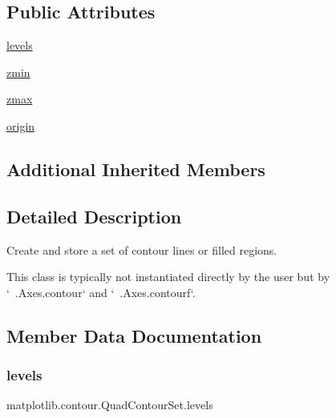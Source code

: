\subsection*{Public Attributes}
\begin{DoxyCompactItemize}
\item 
\hyperlink{classmatplotlib_1_1contour_1_1QuadContourSet_a58fe78201e575f21f0baed0d43b0fac7}{levels}
\item 
\hyperlink{classmatplotlib_1_1contour_1_1QuadContourSet_ad5110dcd6f08c55dcf68a42a78476958}{zmin}
\item 
\hyperlink{classmatplotlib_1_1contour_1_1QuadContourSet_af66067745a8238e5e80e506277aa6633}{zmax}
\item 
\hyperlink{classmatplotlib_1_1contour_1_1QuadContourSet_a8320c500f86a73176c028c9a96a0c6e5}{origin}
\end{DoxyCompactItemize}
\subsection*{Additional Inherited Members}


\subsection{Detailed Description}
\begin{DoxyVerb}Create and store a set of contour lines or filled regions.

This class is typically not instantiated directly by the user but by
`~.Axes.contour` and `~.Axes.contourf`.

\end{DoxyVerb}
 

\subsection{Member Data Documentation}
\mbox{\label{classmatplotlib_1_1contour_1_1QuadContourSet_a58fe78201e575f21f0baed0d43b0fac7}} 
\subsubsection{\texorpdfstring{levels}{levels}}
{\footnotesize\ttfamily matplotlib.\+contour.\+Quad\+Contour\+Set.\+levels}

